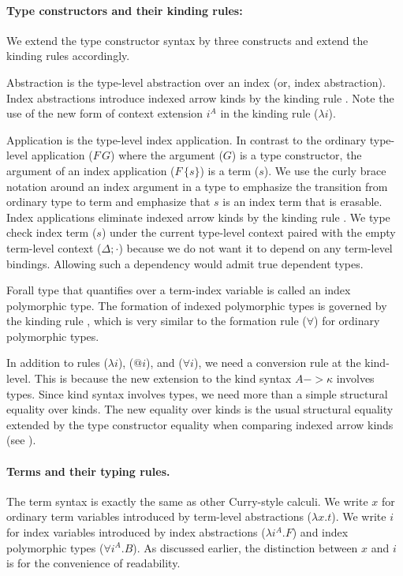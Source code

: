 \paragraph{Type constructors and their kinding rules:}
We extend the type constructor syntax by three constructs
and extend the kinding rules accordingly.

Abstraction  is the type-level abstraction over an index
(or, index abstraction). Index abstractions introduce indexed arrow kinds
by the kinding rule . Note the use of the new form of
context extension $i^A$ in the kinding rule ($\lambda i$).


Application  is the type-level index application. In contrast to
the ordinary type-level application ($F\,G$) where the argument ($G$) is
a type constructor, the argument of an index application ($F\,\{s\}$) is
a term ($s$). We use the curly brace notation around an index argument
in a type to emphasize the transition from ordinary type to term and emphasize
that $s$ is an index term that is erasable. Index applications eliminate
indexed arrow kinds by the kinding rule . We type check
index term ($s$) under the current type-level context paired with
the empty term-level context ($\Delta;\cdot$) because we do not want
it to depend on any term-level bindings. Allowing such a dependency would
admit true dependent types.

Forall type  that quantifies over a term-index variable
is called an index polymorphic type. The formation of indexed polymorphic types
is governed by the kinding rule , which is very similar to
the formation rule ($\forall$) for ordinary polymorphic types.

In addition to rules ($\lambda i$), ($@ i$), and ($\forall i$),
we need a conversion rule  at the kind-level. This is because
the new extension to the kind syntax $A -> \kappa$ involves types.
Since kind syntax involves types, we need more than a simple
structural equality over kinds. The new equality over kinds is
the usual structural equality extended by the type constructor equality
when comparing indexed arrow kinds (see ).

\paragraph{Terms and their typing rules.}
The term syntax is exactly the same as other Curry-style calculi.
We write $x$ for ordinary term variables introduced by
term-level abstractions ($\lambda x.t$). We write $i$ for index variables
introduced by index abstractions ($\lambda i^A.F$) and
index polymorphic types ($\forall i^A.B$). As discussed earlier,
the distinction between $x$ and $i$ is for the convenience of readability.

